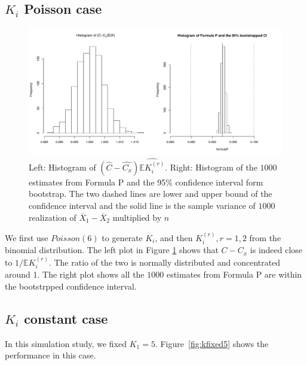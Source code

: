 \documentclass[12pt,letterpaper]{article}
\newcommand{\wht}{\widehat}
\newcommand{\bbe}{\mathbb{E}}
\newcommand{\xbar}{\overline{X}}
\begin{document}
\subsection{$K_i$ Poisson case}
\begin{figure}[!hbtp]
  \centering
  \includegraphics[width=\textwidth]{kpois6}
  \caption{Left: Histogram of $(\wht{C}-\wht{C_x})\wht{\bbe K_i^{(r)}}$. Right: Histogram of the $1000$ estimates from Formula P and the 95\% confidence interval form bootstrap. The two dashed lines are lower and upper bound of the confidence interval and the solid line is the sample variance of $1000$ realization of $\xbar_1-\xbar_2$ multiplied by $n$}
  \label{fig:kpois6}
\end{figure}
We first use $Poisson(6)$ to generate $K_i$, and then $K_i^{(r)},r=1,2$ from the binomial distribution. The left plot in Figure \ref{fig:kpois6} shows that $C-C_x$ is indeed close to $1/\bbe K_i^{(r)}$. The ratio of the two is normally distributed and concentrated around 1. The right plot shows all the $1000$ estimates from Formula P are within the bootstrpped confidence interval. 



\subsection{$K_i$ constant case}
In this simulation study, we fixed $K_1=5$. Figure~\ref{fig:kfixed5} shows the performance in this case.
\end{document}
